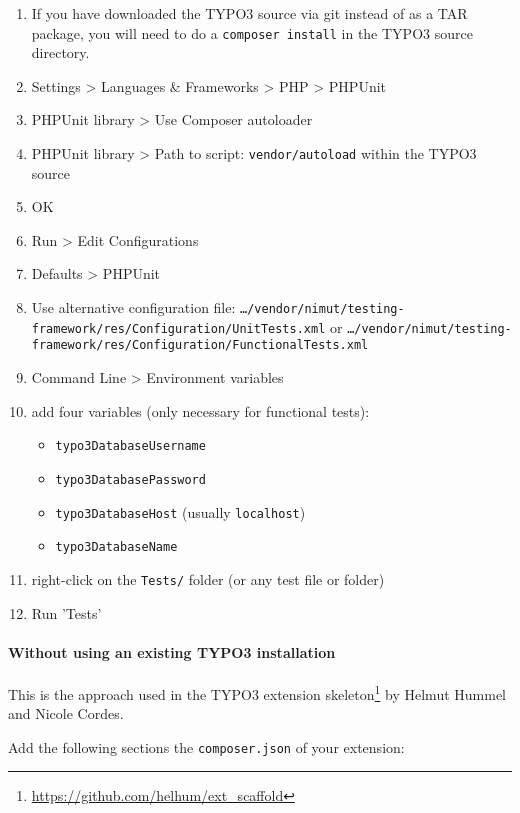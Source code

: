 \documentclass[a4paper,11pt,headsepline]{scrartcl}
\begin{document}
\begin{enumerate}
  \item If you have downloaded the TYPO3 source via git instead of as a TAR package, you will need to do a \texttt{composer install} in the TYPO3 source directory.
  \item Settings > Languages \& Frameworks > PHP > PHPUnit
  \item PHPUnit library > Use Composer autoloader
  \item PHPUnit library > Path to script: \texttt{vendor/autoload} within the TYPO3 source
  \item OK
  \item Run > Edit Configurations
  \item Defaults > PHPUnit
  \item Use alternative configuration file: \texttt{…/vendor/nimut/testing-framework/res/Configuration/UnitTests.xml} or \texttt{…/vendor/nimut/testing-framework/res/Configuration/FunctionalTests.xml}
  \item Command Line > Environment variables
  \item add four variables (only necessary for functional tests):
    \begin{itemize}
      \item \texttt{typo3DatabaseUsername}
      \item \texttt{typo3DatabasePassword}
      \item \texttt{typo3DatabaseHost} (usually \texttt{localhost})
      \item \texttt{typo3DatabaseName}
    \end{itemize}
  \item right-click on the \texttt{Tests/} folder (or any test file or folder)
  \item Run 'Tests'
\end{enumerate}


\paragraph{Without using an existing TYPO3 installation}

This is the approach used in the TYPO3 extension skeleton\footnote{\url{https://github.com/helhum/ext_scaffold}} by Helmut Hummel and Nicole Cordes.

Add the following sections the \texttt{composer.json} of your extension:

\small
{}
\normalsize
\end{document}
